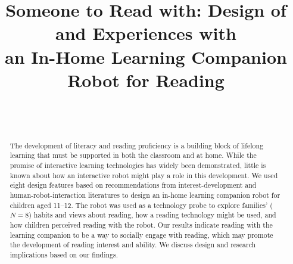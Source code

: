\documentclass{sigchi}
\def\plaintitle{Someone to Read with: Design of and Experiences with \\ an In-Home Learning Companion Robot for Reading}
\begin{document}
\title{\plaintitle}

\author{%
  \\
  \\
}

\maketitle

\begin{abstract}
  The development of literacy and reading proficiency is a building block of lifelong learning that must be supported in both the classroom and at home. While the promise of interactive learning technologies has widely been demonstrated, little is known about how an interactive robot might play a role in this development. We used eight design features based on recommendations from interest-development and human-robot-interaction literatures to design an in-home learning companion robot for children aged 11--12. The robot was used as a technology probe to explore families' ($N=8$) habits and views about reading, how a reading technology might be used, and how children perceived reading with the robot. Our results indicate reading with the learning companion to be a way to socially engage with reading, which may promote the development of reading interest and ability. We discuss design and research implications based on our findings.
\end{abstract}

 
\end{document}
